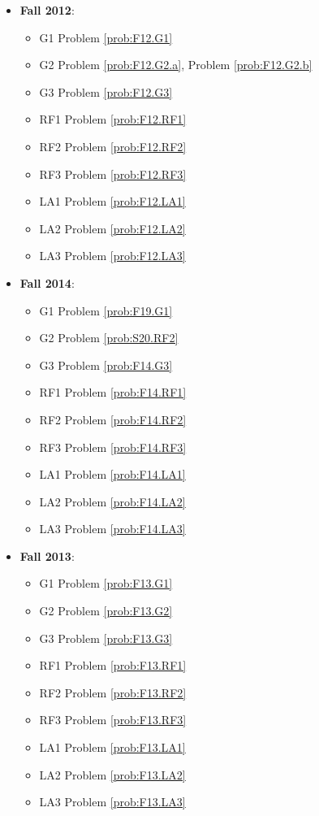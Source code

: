 \documentclass{article}
\theoremstyle{definition}
\begin{document}
\begin{itemize}
	\item \textbf{Fall 2012}:	
	\begin{itemize}
	\item G1 Problem \ref{prob:F12.G1} 
	\item G2 Problem \ref{prob:F12.G2.a}, Problem \ref{prob:F12.G2.b}
	\item G3 Problem \ref{prob:F12.G3}
	\item RF1 Problem \ref{prob:F12.RF1}
	\item RF2 Problem \ref{prob:F12.RF2}
	\item RF3 Problem \ref{prob:F12.RF3}
	\item LA1 Problem \ref{prob:F12.LA1}
	\item LA2 Problem \ref{prob:F12.LA2}
	\item LA3 Problem \ref{prob:F12.LA3}	
	\end{itemize}	
	\item \textbf{Fall 2014}:  
	\begin{itemize}
	\item G1 Problem \ref{prob:F19.G1} 
	\item G2 Problem \ref{prob:S20.RF2} 
	\item G3 Problem \ref{prob:F14.G3}
	\item RF1 Problem \ref{prob:F14.RF1}
	\item RF2 Problem \ref{prob:F14.RF2}
	\item RF3 Problem \ref{prob:F14.RF3}
	\item LA1 Problem \ref{prob:F14.LA1}
	\item LA2 Problem \ref{prob:F14.LA2}
	\item LA3 Problem \ref{prob:F14.LA3}
	\end{itemize}
	\item \textbf{Fall 2013}:  
	\begin{itemize}
	\item G1 Problem \ref{prob:F13.G1} 
	\item G2 Problem \ref{prob:F13.G2} 
	\item G3 Problem \ref{prob:F13.G3}
	\item RF1 Problem \ref{prob:F13.RF1}
	\item RF2 Problem \ref{prob:F13.RF2}
	\item RF3 Problem \ref{prob:F13.RF3}
	\item LA1 Problem \ref{prob:F13.LA1}
	\item LA2 Problem \ref{prob:F13.LA2}
	\item LA3 Problem \ref{prob:F13.LA3}
	\end{itemize}


\end{itemize}
\end{document}
